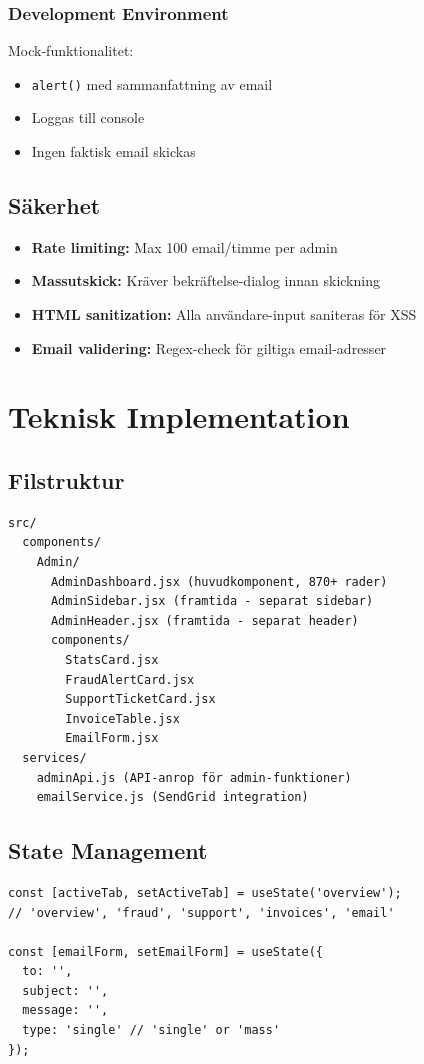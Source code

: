 \documentclass[12pt,a4paper]{article}
\begin{document}
\subsubsection{Development Environment}
Mock-funktionalitet:
\begin{itemize}
  \item \texttt{alert()} med sammanfattning av email
  \item Loggas till console
  \item Ingen faktisk email skickas
\end{itemize}

\subsection{Säkerhet}
\begin{itemize}
  \item \textbf{Rate limiting:} Max 100 email/timme per admin
  \item \textbf{Massutskick:} Kräver bekräftelse-dialog innan skickning
  \item \textbf{HTML sanitization:} Alla användare-input saniteras för XSS
  \item \textbf{Email validering:} Regex-check för giltiga email-adresser
\end{itemize}

\section{Teknisk Implementation}

\subsection{Filstruktur}
\begin{verbatim}
src/
  components/
    Admin/
      AdminDashboard.jsx (huvudkomponent, 870+ rader)
      AdminSidebar.jsx (framtida - separat sidebar)
      AdminHeader.jsx (framtida - separat header)
      components/
        StatsCard.jsx
        FraudAlertCard.jsx
        SupportTicketCard.jsx
        InvoiceTable.jsx
        EmailForm.jsx
  services/
    adminApi.js (API-anrop för admin-funktioner)
    emailService.js (SendGrid integration)
\end{verbatim}

\subsection{State Management}
\begin{lstlisting}[basicstyle=\small\ttfamily]
const [activeTab, setActiveTab] = useState('overview');
// 'overview', 'fraud', 'support', 'invoices', 'email'

const [emailForm, setEmailForm] = useState({
  to: '',
  subject: '',
  message: '',
  type: 'single' // 'single' or 'mass'
});
\end{lstlisting}
\end{document}
